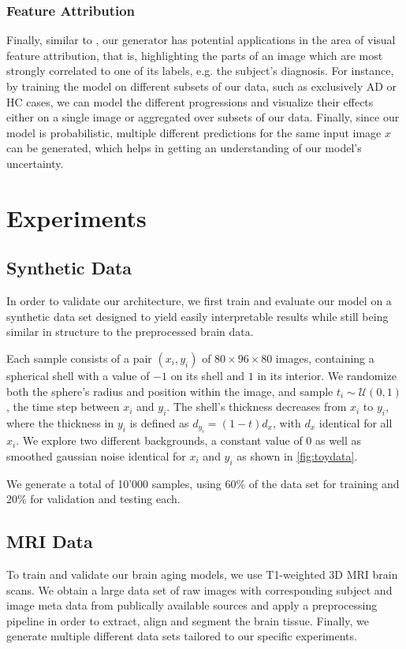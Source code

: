 \subsection{Feature Attribution}
Finally, similar to \cite{baumgartner2018visual}, our generator has potential applications in the area of visual feature attribution, that is, highlighting the parts of an image which are most strongly correlated to one of its labels, e.g. the subject's diagnosis.
For instance, by training the model on different subsets of our data, such as exclusively AD or HC cases, we can model the different progressions and visualize their effects either on a single image or aggregated over subsets of our data.
Finally, since our model is probabilistic, multiple different predictions for the same input image $x$ can be generated, which helps in getting an understanding of our model's uncertainty.

\chapter{Experiments}

\section{Synthetic Data}
\label{sec:datsynth}
In order to validate our architecture, we first train and evaluate our model on a synthetic data set designed to yield easily interpretable results while still being similar in structure to the preprocessed brain data.

Each sample consists of a pair $(x_i, y_i)$ of $ 80 \times 96 \times 80 $ images, containing a spherical shell with a value of $-1$ on its shell and $1$ in its interior. We randomize both the sphere's radius and position within the image, and sample $t_i \sim \mathcal{U}(0, 1)$, the time step between $x_i$ and $y_i$. The shell's thickness decreases from $x_i$ to $y_i$, where the thickness in $y_i$ is defined as $d_{y_i} = (1-t) d_x$, with $d_x$ identical for all $x_i$. We explore two different backgrounds, a constant value of 0 as well as smoothed gaussian noise identical for $x_i$ and $y_i$ as shown in \autoref{fig:toydata}.

We generate a total of 10'000 samples, using 60\% of the data set for training and 20\% for validation and testing each.

\section{MRI Data}
To train and validate our brain aging models, we use T1-weighted 3D MRI brain scans. We obtain a large data set of raw images with corresponding subject and image meta data from publically available sources and apply a preprocessing pipeline in order to extract, align and segment the brain tissue. Finally, we generate multiple different data sets tailored to our specific experiments.

